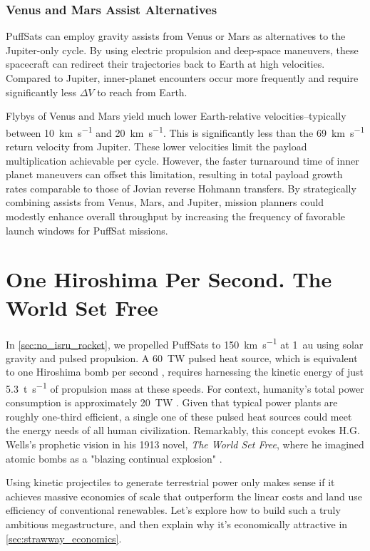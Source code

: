 \documentclass{article}
\begin{document}
{\subsubsection{Venus and Mars Assist Alternatives}
PuffSats can employ gravity assists from Venus or Mars as alternatives to the Jupiter-only cycle. By using electric propulsion and deep-space maneuvers, these spacecraft can redirect their trajectories back to Earth at high velocities. Compared to Jupiter, inner-planet encounters occur more frequently and require significantly less $\Delta V$ to reach from Earth.   

Flybys of Venus and Mars yield much lower Earth-relative velocities--typically between \SI{10}{\kilo\meter\per\second} and \SI{20}{\kilo\meter\per\second}.  This is significantly less than the \SI{69}{\kilo\meter\per\second} return velocity from Jupiter. These lower velocities limit the payload multiplication achievable per cycle. However, the faster turnaround time of inner planet maneuvers can offset this limitation, resulting in total payload growth rates comparable to those of Jovian reverse Hohmann transfers. By strategically combining assists from Venus, Mars, and Jupiter, mission planners could modestly enhance overall throughput by increasing the frequency of favorable launch windows for PuffSat missions.

\section{One Hiroshima Per Second. The World Set Free}\label{sec:world_set_free}
In \autoref{sec:no_isru_rocket}, we propelled PuffSats to \SI{150}{\kilo\meter\per\second} at \SI{1}{\astronomicalunit} using solar gravity and pulsed propulsion. A \SI{60}{\tera\watt} pulsed heat source, which is equivalent to one Hiroshima bomb per second \cite{hiroshima}, requires harnessing the kinetic energy of just \SI{5.3}{\tonne\per\second} of propulsion mass at these speeds. For context, humanity's total power consumption is approximately \SI{20}{\tera\watt} \cite{owid-energy-production-consumption}. Given that typical power plants are roughly one-third efficient, a single one of these pulsed heat sources could meet the energy needs of all human civilization.  Remarkably, this concept evokes H.G. Wells's prophetic vision in his 1913 novel, \textit{The World Set Free}, where he imagined atomic bombs as a "blazing continual explosion" \cite{wells1914world}.  

Using kinetic projectiles to generate terrestrial power only makes sense if it achieves massive economies of scale that outperform the linear costs and land use efficiency of conventional renewables.  Let's explore how to build such a truly ambitious megastructure, and then explain why it's economically attractive in \autoref{sec:strawway_economics}.     

}
\end{document}
